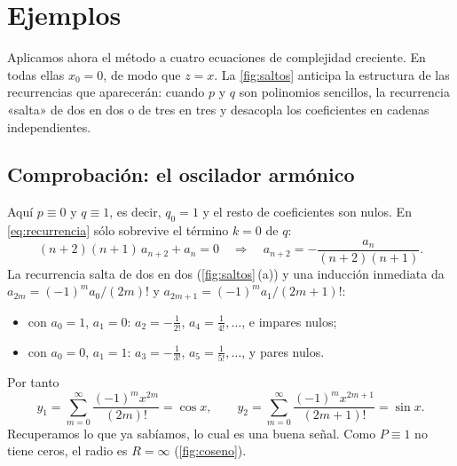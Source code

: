 \section{Ejemplos}\label{sec:ejemplos}

Aplicamos ahora el método a cuatro ecuaciones de complejidad creciente. En
todas ellas $x_0=0$, de modo que $z=x$. La \cref{fig:saltos} anticipa la
estructura de las recurrencias que aparecerán: cuando $p$ y $q$ son
polinomios sencillos, la recurrencia «salta» de dos en dos o de tres en
tres y desacopla los coeficientes en cadenas independientes.



\subsection{Comprobación: el oscilador armónico}\label{sec:oscilador}

\begin{ejemplo}[$y''+y=0$]\label{ej:oscilador}
Aquí $p\equiv0$ y $q\equiv1$, es decir, $q_0=1$ y el resto de coeficientes
son nulos. En \eqref{eq:recurrencia} sólo sobrevive el término $k=0$ de
$q$:
\begin{equation}\label{eq:rec-oscilador}
  (n+2)(n+1)\,a_{n+2}+a_n=0
  \quad\Longrightarrow\quad
  a_{n+2}=-\frac{a_n}{(n+2)(n+1)} .
\end{equation}
La recurrencia salta de dos en dos (\cref{fig:saltos}\,(a)) y una inducción
inmediata da $a_{2m}=(-1)^{m}a_0/(2m)!$ y $a_{2m+1}=(-1)^{m}a_1/(2m+1)!$:
\begin{itemize}
  \item con $a_0=1$, $a_1=0$: $a_2=-\frac1{2!}$, $a_4=\frac1{4!},\dots$, e
        impares nulos;
  \item con $a_0=0$, $a_1=1$: $a_3=-\frac1{3!}$, $a_5=\frac1{5!},\dots$, y
        pares nulos.
\end{itemize}
Por tanto
\begin{equation}\label{eq:cos-sen}
  y_1=\sum_{m=0}^{\infty}\frac{(-1)^{m}x^{2m}}{(2m)!}=\cos x,
  \qquad
  y_2=\sum_{m=0}^{\infty}\frac{(-1)^{m}x^{2m+1}}{(2m+1)!}=\sin x .
\end{equation}
Recuperamos lo que ya sabíamos, lo cual es una buena señal. Como $P\equiv1$
no tiene ceros, el radio es $R=\infty$ (\cref{fig:coseno}).
\end{ejemplo}

